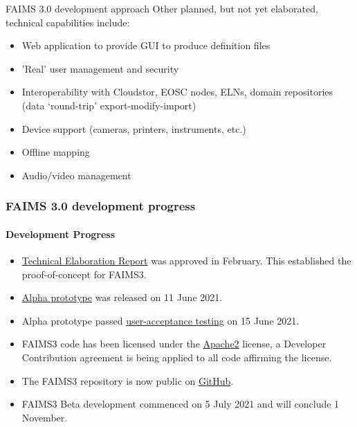 \documentclass[
	aspectratio=169, %
	12pt, %
	t, %
]{beamer}
\begin{document}
\begin{refsegment}
\begin{sectionframe}
\end{sectionframe}



\begin{frame}{FAIMS 3.0 development approach}
Other planned, but not yet elaborated, technical capabilities include:
    \begin{itemize}
        \item Web application to provide GUI to produce definition files
        \item 'Real' user management and security
        \item Interoperability with Cloudstor, EOSC nodes, ELNs, domain repositories (data `round-trip' export-modify-import)
        \item Device support (cameras, printers, instruments, etc.)
        \item Offline mapping
        \item Audio/video management
    \end{itemize}
\end{frame}


\begin{frame}
    \frametitle{FAIMS 3.0 development progress}
    \framesubtitle{Development Progress}        
        \begin{itemize}
            \item \href{https://docs.google.com/document/d/13eTN8jhJa3Pgs9GOdo7r4jtIQcskNo7ikxJcBDBKHzw/edit}{Technical Elaboration Report} was approved in February. This established the proof-of-concept for FAIMS3. 
          \item \href{https://github.com/FAIMS/FAIMS3/releases/tag/v0.1.0-alpha}{Alpha prototype} was released on 11 June 2021.  
          \item Alpha prototype passed \href{https://doi.org/10.5281/zenodo.5030772}{user-acceptance testing} on 15 June 2021.
        \item FAIMS3 code has been licensed under the \href{https://www.apache.org/licenses/LICENSE-2.0}{Apache2} license, a Developer Contribution agreement is being applied to all code affirming the license. 
        \item The FAIMS3 repository is now public on \href{https://github.com/FAIMS/FAIMS3}{GitHub}.
        \item FAIMS3 Beta development commenced on 5 July 2021 and will conclude 1 November. 


\end{itemize}
\end{frame}
\end{refsegment}
\end{document}
